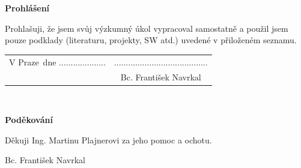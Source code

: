 \documentclass[a4paper,twoside,12pt]{scrbook}
\newcommand{\tb}{\textbf} %
\newcommand{\woman}{} %
\newcommand{\autor}{Bc. František Navrkal}   %
\newcommand{\kde}{Praze} %
\newcommand{\prohlaseni}{Prohlašuji, že jsem svůj výzkumný úkol vypracoval\woman{} samostatně a použil\woman{} jsem pouze podklady (literaturu, projekty, SW atd.) uvedené v přiloženém seznamu.} %
\newcommand{\podekovani}{Děkuji Ing. Martinu Plajnerovi za jeho pomoc a ochotu.} %
\begin{document}
\newpage %
\thispagestyle{empty}  %

~ %

\newpage %
\thispagestyle{empty}  %

~ %
\vfill %

\tb{Prohlášení} %

\vspace{1em} %
\prohlaseni

\vspace{2em}  %
\hspace{-0.5em}\begin{tabularx}{\textwidth}{X c}  %
V \kde\ dne .................... &........................................ \\	%
	& \autor
\end{tabularx}	%


\newpage
\thispagestyle{empty}

~
\vfill %


\tb{Poděkování}

\vspace{1em} %
\podekovani
\begin{flushright}
\autor
\end{flushright}  %
\end{document}
